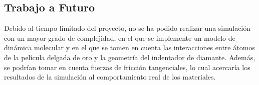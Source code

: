 \documentclass[final,6p,times,twocolumn]{elsarticle}
\begin{document}
\subsection{Trabajo a Futuro}
Debido al tiempo limitado del proyecto, no se ha podido realizar una simulaci\'on con un mayor grado de complejidad, en el que se implemente un modelo de din\'amica molecular y en el que se tomen en cuenta las interacciones entre \'atomos de la pel\'icula delgada de oro y la geometr\'ia del indentador de diamante. Adem\'as, se podr\'ian tomar en cuenta fuerzas de fricci\'on tangenciales, lo cual acercar\'ia los resultados de la simulaci\'on al comportamiento real de los materiales.



\end{document}
